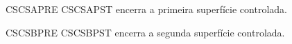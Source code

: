 \documentclass{abntexto-ufc}
\begin{document}
\textual

\noindent CSCSAPRE \cite{silva2020} CSCSAPST encerra a primeira superfície controlada.

\noindent CSCSBPRE \textcite{oliveira2011} CSCSBPST encerra a segunda superfície controlada.
\end{document}
